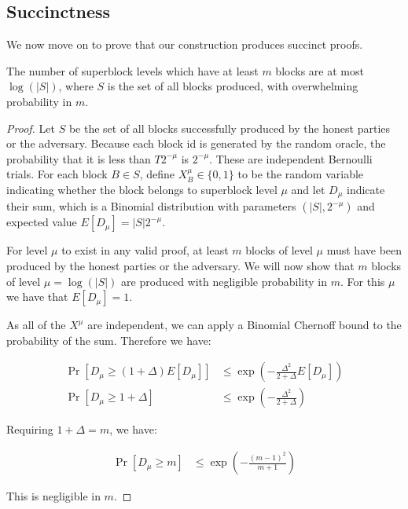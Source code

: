 \subsection{Succinctness}

We now move on to prove that our construction produces succinct proofs.

\begin{theorem}
    \label{thm.few-levels}
    The number of superblock levels which have at least $m$ blocks are at most
    $\log(|S|)$, where $S$ is the set of all blocks produced, with overwhelming
    probability in $m$.
\end{theorem}

\begin{proof}
    Let $S$ be the set of all blocks successfully produced by the honest
    parties or the adversary. Because each block id is generated by the random
    oracle, the probability that it is less than $T 2^{-\mu}$ is
    $2^{-\mu}$. These are independent Bernoulli trials. For each block
    $B \in S$, define $X^{\mu}_B \in \{0, 1\}$ to be the random variable
    indicating whether the block belongs to superblock level $\mu$ and let
    $D_\mu$ indicate their sum, which is a Binomial distribution with
    parameters $(|S|, 2^{-\mu})$ and expected value $E[D_{\mu}] =
    |S| 2^{-\mu}$.

    For level $\mu$ to exist in any valid proof, at least $m$ blocks of level
    $\mu$ must have been produced by the honest parties or the adversary. We
    will now show that $m$ blocks of level $\mu = \log(|S|)$ are produced with
    negligible probability in $m$. For this $\mu$ we have that $E[D_\mu] = 1$.

    As all of the $X^{\mu}$ are independent, we can apply a Binomial Chernoff
    bound to the probability of the sum. Therefore we have:

    \begin{align*}
        \Pr[D_\mu \geq (1 + \Delta)E[D_\mu]] &\leq \exp(-\frac{\Delta^2}{2 + \Delta}E[D_\mu]) \\
        \Pr[D_\mu \geq 1 + \Delta] &\leq \exp(-\frac{\Delta^2}{2 + \Delta})
    \end{align*}

    Requiring $1 + \Delta = m$, we have:

    \begin{align*}
        \Pr[D_\mu \geq m] &\leq \exp(-\frac{(m - 1)^2}{m + 1})
    \end{align*}

    This is negligible in $m$.
\end{proof}

